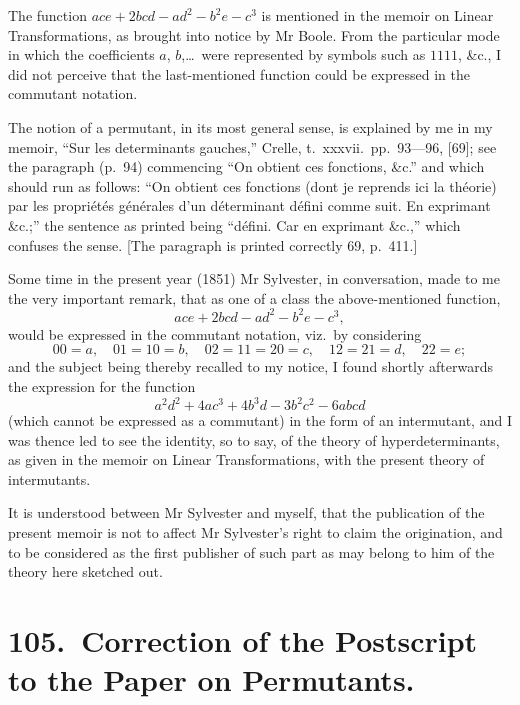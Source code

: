 \documentclass[11pt,a4paper]{article}
\theoremstyle{plain}
\begin{document}
The function $ace + 2bcd - ad^2 - b^2e - c^3$ is mentioned in the memoir on Linear Transformations, as brought into notice by Mr Boole. From the particular mode in which the coefficients $a$, $b$,\ldots\ were represented by symbols such as $1111$, \&c., I did not perceive that the last-mentioned function could be expressed in the commutant notation.

The notion of a permutant, in its most general sense, is explained by me in my memoir, ``Sur les determinants gauches,'' Crelle, t.\ xxxvii.\ pp.\ 93---96, [69]; see the paragraph (p.\ 94) commencing ``On obtient ces fonctions, \&c.'' and which should run as follows: ``On obtient ces fonctions (dont je reprends ici la th\'{e}orie) par les propri\'{e}t\'{e}s g\'{e}n\'{e}rales d'un d\'{e}terminant d\'{e}fini comme suit. En exprimant \&c.;'' the sentence as printed being ``d\'{e}fini. Car en exprimant \&c.,'' which confuses the sense. [The paragraph is printed correctly 69, p.\ 411.]

Some time in the present year (1851) Mr Sylvester, in conversation, made to me the very important remark, that as one of a class the above-mentioned function,
\[ace + 2bcd - ad^2 - b^2e - c^3,\]
would be expressed in the commutant notation, viz.\ by considering
\[00 = a, \quad 01 = 10 = b, \quad 02 = 11 = 20 = c, \quad 12 = 21 = d, \quad 22 = e;\]
and the subject being thereby recalled to my notice, I found shortly afterwards the expression for the function
\[a^2d^2 + 4ac^3 + 4b^3d - 3b^2c^2 - 6abcd\]
(which cannot be expressed as a commutant) in the form of an intermutant, and I was thence led to see the identity, so to say, of the theory of hyperdeterminants, as given in the memoir on Linear Transformations, with the present theory of intermutants.

It is understood between Mr Sylvester and myself, that the publication of the present memoir is not to affect Mr Sylvester's right to claim the origination, and to be considered as the first publisher of such part as may belong to him of the theory here sketched out.
\clearpage


\section*{105.\ Correction of the Postscript to the Paper on Permutants.}
\end{document}
